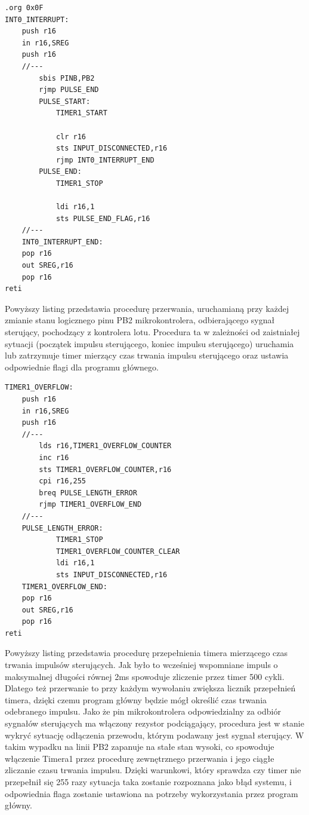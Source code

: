 \begin{lstlisting}
.org 0x0F 
INT0_INTERRUPT:
	push r16
	in r16,SREG
	push r16
	//---
		sbis PINB,PB2
		rjmp PULSE_END
		PULSE_START:
			TIMER1_START

			clr r16
			sts INPUT_DISCONNECTED,r16
			rjmp INT0_INTERRUPT_END
		PULSE_END:
			TIMER1_STOP
			
			ldi r16,1
			sts PULSE_END_FLAG,r16
	//---
	INT0_INTERRUPT_END:
	pop r16
	out SREG,r16
	pop r16
reti
\end{lstlisting}

Powyższy listing przedstawia procedurę przerwania, uruchamianą przy każdej zmianie stanu logicznego pinu PB2 mikrokontrolera, odbierającego sygnał sterujący, pochodzący z kontrolera lotu. Procedura ta w zależności od zaistniałej sytuacji (początek impulsu sterującego, koniec impulsu sterującego) uruchamia lub zatrzymuje timer mierzący czas trwania impulsu sterującego oraz ustawia odpowiednie flagi dla programu głównego. 

\begin{lstlisting}
TIMER1_OVERFLOW:
	push r16
	in r16,SREG
	push r16
	//---
		lds r16,TIMER1_OVERFLOW_COUNTER
		inc r16
		sts TIMER1_OVERFLOW_COUNTER,r16
		cpi r16,255
		breq PULSE_LENGTH_ERROR
		rjmp TIMER1_OVERFLOW_END
	//---
	PULSE_LENGTH_ERROR:
			TIMER1_STOP
			TIMER1_OVERFLOW_COUNTER_CLEAR
			ldi r16,1
			sts INPUT_DISCONNECTED,r16
	TIMER1_OVERFLOW_END:
	pop r16
	out SREG,r16
	pop r16
reti
\end{lstlisting}

Powyższy listing przedstawia procedurę przepełnienia timera mierzącego czas trwania impulsów sterujących. Jak było to wcześniej wspomniane impuls o maksymalnej długości równej 2ms spowoduje zliczenie przez timer 500 cykli. Dlatego też przerwanie to przy każdym wywołaniu zwiększa licznik przepełnień timera, dzięki czemu program główny będzie mógł określić czas trwania odebranego impulsu. Jako że pin mikrokontrolera odpowiedzialny za odbiór sygnałów sterujących ma włączony rezystor podciągający, procedura jest w stanie wykryć sytuację odłączenia przewodu, którym podawany jest sygnał sterujący. W takim wypadku na linii PB2 zapanuje na stałe stan wysoki, co spowoduje włączenie Timera1 przez procedurę zewnętrznego przerwania i jego ciągłe zliczanie czasu trwania impulsu. Dzięki warunkowi, który sprawdza czy timer nie przepełnił się 255 razy sytuacja taka zostanie rozpoznana jako błąd systemu, i odpowiednia flaga zostanie ustawiona na potrzeby wykorzystania przez program główny. 



